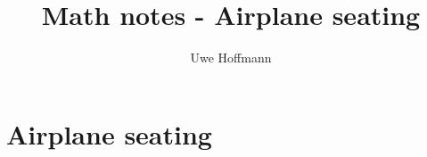 

\title{Math notes - Airplane seating}
\author{Uwe Hoffmann}



\setcounter{chapter}{0}
\chapter{Airplane seating}
